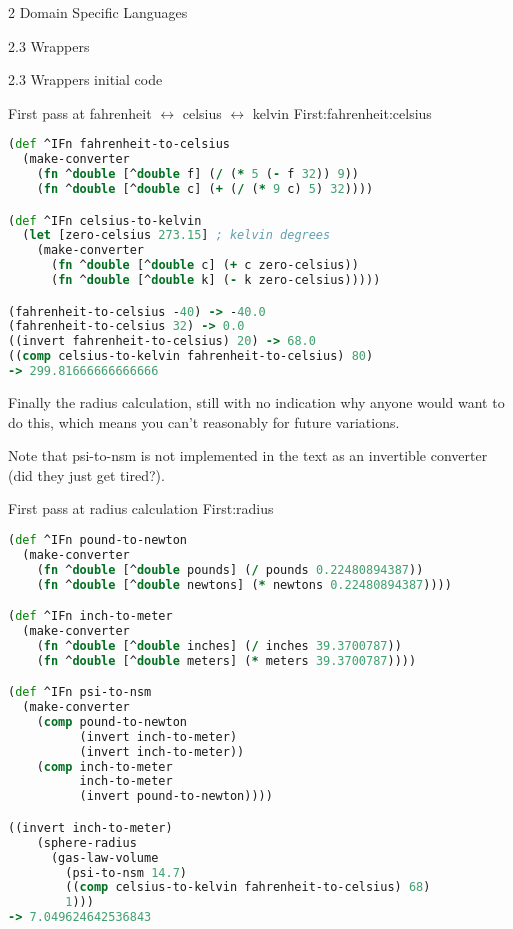 \documentclass[12pt]{PalisadesLakesBook}
\begin{document}
\begin{plSection}{}
\begin{plSection}{2 Domain Specific Languages}
\begin{plSection}{2.3 Wrappers}
\begin{plSection}{2.3 Wrappers initial code}
\begin{plListing}
{First pass at 
fahrenheit $\leftrightarrow$ celsius $\leftrightarrow$ kelvin}
{First:fahrenheit:celsius}
\begin{lstlisting}[language=clojure]
(def ^IFn fahrenheit-to-celsius
  (make-converter 
    (fn ^double [^double f] (/ (* 5 (- f 32)) 9))
    (fn ^double [^double c] (+ (/ (* 9 c) 5) 32))))

(def ^IFn celsius-to-kelvin
  (let [zero-celsius 273.15] ; kelvin degrees
    (make-converter 
      (fn ^double [^double c] (+ c zero-celsius))
      (fn ^double [^double k] (- k zero-celsius)))))

(fahrenheit-to-celsius -40) -> -40.0
(fahrenheit-to-celsius 32) -> 0.0
((invert fahrenheit-to-celsius) 20) -> 68.0
((comp celsius-to-kelvin fahrenheit-to-celsius) 80)
-> 299.81666666666666
\end{lstlisting}
\end{plListing}

Finally the radius calculation, 
still with no indication why anyone would want to do this,
which means you can't reasonably for future variations.

Note that {\schemeFont psi-to-nsm} is not implemented in the 
text as an invertible converter (did they just get tired?).

\begin{plListing}
{First pass at radius calculation}
{First:radius}
\begin{lstlisting}[language=clojure]
(def ^IFn pound-to-newton
  (make-converter 
    (fn ^double [^double pounds] (/ pounds 0.22480894387))
    (fn ^double [^double newtons] (* newtons 0.22480894387))))

(def ^IFn inch-to-meter
  (make-converter 
    (fn ^double [^double inches] (/ inches 39.3700787))
    (fn ^double [^double meters] (* meters 39.3700787))))

(def ^IFn psi-to-nsm
  (make-converter 
    (comp pound-to-newton
          (invert inch-to-meter)
          (invert inch-to-meter))
    (comp inch-to-meter 
          inch-to-meter 
          (invert pound-to-newton))))

((invert inch-to-meter)
    (sphere-radius
      (gas-law-volume
        (psi-to-nsm 14.7)
        ((comp celsius-to-kelvin fahrenheit-to-celsius) 68)
        1)))
-> 7.049624642536843
\end{lstlisting}
\end{plListing}


\end{plSection}
\end{plSection}
\end{plSection}
\end{plSection}
\end{document}
